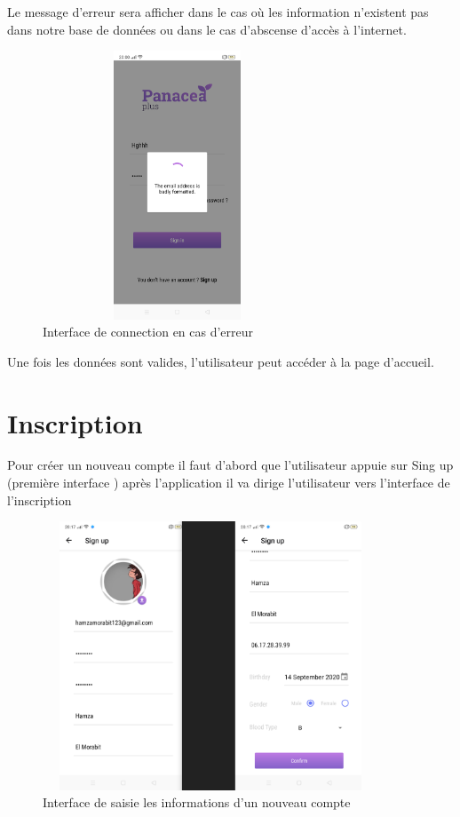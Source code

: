 Le message d'erreur sera afficher dans le cas où les information n'existent pas dans notre base de données ou dans le cas d'abscense d'accès à l'internet.
\begin{figure}[H]
  \centering
\includegraphics[width=8cm,height=8cm,keepaspectratio]{Application/er.png} 
\caption{Interface de connection en cas d’erreur}
\end{figure}

Une fois les données sont valides, l'utilisateur peut accéder à la page d'accueil.
\section{Inscription}

Pour créer un nouveau compte il faut d'abord que l’utilisateur  appuie sur Sing up (première interface ) après l'application il va dirige l'utilisateur vers l'interface de l'inscription
\begin{figure}[H]
  \centering
\includegraphics[width=10cm,height=8cm,keepaspectratio]{Application/med1.png} 
\caption{Interface de saisie les informations d'un nouveau compte}
\end{figure}


